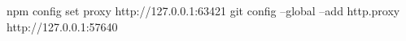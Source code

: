 npm config set proxy http://127.0.0.1:63421
git config --global --add http.proxy http://127.0.0.1:57640